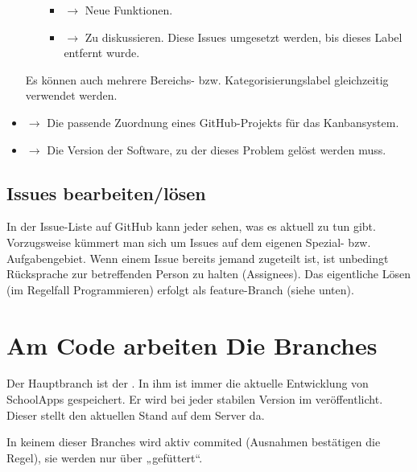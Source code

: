 \documentclass[letterpaper,10pt,ngerman]{sphinxmanual}
\begin{document}
\begin{itemize}
\begin{itemize}
\begin{itemize}
\item {} 
 \(\rightarrow\) Neue Funktionen.

\item {} 
 \(\rightarrow\) Zu diskussieren. Diese Issues  umgesetzt werden, bis dieses Label entfernt wurde.

\end{itemize}

\end{itemize}

Es können auch mehrere Bereichs- bzw. Kategorisierungslabel gleichzeitig verwendet werden.

\item {} 
 \(\rightarrow\) Die passende Zuordnung eines GitHub-Projekts für das Kanbansystem.

\item {} 
 \(\rightarrow\) Die Version der Software, zu der dieses Problem gelöst werden muss.

\end{itemize}


\subsection{Issues bearbeiten/lösen}
\label{\detokenize{dev/git:issues-bearbeiten-losen}}
In der Issue-Liste auf GitHub kann jeder sehen, was es aktuell zu tun gibt.
Vorzugsweise kümmert man sich um Issues auf dem eigenen Spezial- bzw. Aufgabengebiet. Wenn einem Issue bereits jemand zugeteilt ist, ist unbedingt Rücksprache zur betreffenden Person zu halten (Assignees).
Das eigentliche Lösen (im Regelfall Programmieren) erfolgt als feature-Branch  (siehe unten).


\section{Am Code arbeiten \textendash{} Die Branches}
\label{\detokenize{dev/git:am-code-arbeiten-die-branches}}
Der Hauptbranch ist der . In ihm ist immer die aktuelle Entwicklung von SchoolApps gespeichert. Er wird bei jeder stabilen Version im  veröffentlicht. Dieser stellt den aktuellen Stand auf dem Server da.

In keinem dieser Branches wird aktiv commited (Ausnahmen bestätigen die Regel), sie werden nur über  „gefüttert“.
\end{document}
